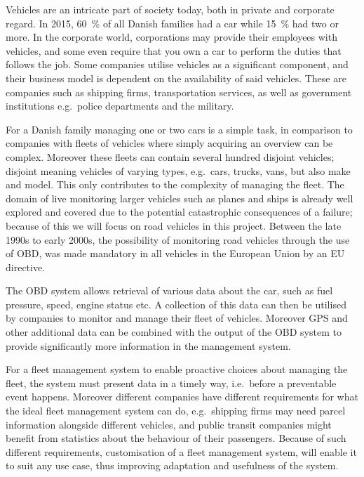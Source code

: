 Vehicles are an intricate part of society today, both in private and corporate regard.
In 2015, 60~\% of all Danish families had a car while 15~\% had two or more\cite{MoreCarsInFamilies}.
In the corporate world, corporations may provide their employees with vehicles,
and some even require that you own a car to perform the duties that follows the job.
Some companies utilise vehicles as a significant component,
and their business model is dependent on the availability of said vehicles.
These are companies such as shipping firms, transportation services,
as well as government institutions e.g.~police departments and the military.

\bigskip
For a Danish family managing one or two cars is a simple task,
in comparison to companies with fleets of vehicles where simply acquiring an overview can be complex.
Moreover these fleets can contain several hundred disjoint vehicles;
disjoint meaning vehicles of varying types, e.g.~cars, trucks, vans, but also make and model.
This only contributes to the complexity of managing the fleet.
The domain of live monitoring larger vehicles such as planes and ships is already well explored and covered
due to the potential catastrophic consequences of a failure;
because of this we will focus on road vehicles in this project.
Between the late 1990s to early 2000s, the possibility of monitoring road vehicles through the use of \acl{OBD},
was made mandatory in all vehicles in the European Union by an EU directive\cite{EUDirective}.

The \ac{OBD} system allows retrieval of various data about the car, such as fuel pressure, speed, engine status etc.
A collection of this data can then be utilised by companies to monitor and manage their fleet of vehicles.
Moreover GPS and other additional data can be combined with the output of the \ac{OBD} system
to provide significantly more information in the management system.

\bigskip
For a fleet management system to enable proactive choices about managing the fleet,
the system must present data in a timely way, i.e.~before a preventable event happens.
Moreover different companies have different requirements for what the ideal fleet management system can do,
e.g.~shipping firms may need parcel information alongside different vehicles,
and public transit companies might benefit from statistics about the behaviour of their passengers.
Because of such different requirements, customisation of a fleet management system,
will enable it to suit any use case, thus improving adaptation and usefulness of the system.

